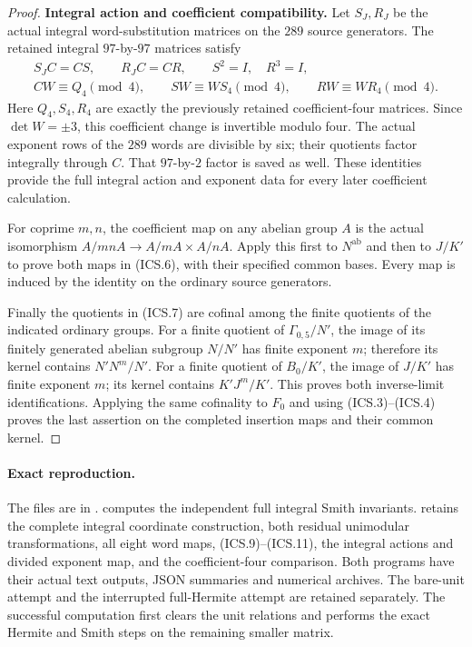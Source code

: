 \begin{proof}
\par\medskip\noindent\textbf{Integral action and coefficient compatibility.}\quad
Let $S_J,R_J$ be the actual integral word-substitution
matrices on the $289$ source generators. The retained
integral $97$-by-$97$ matrices satisfy
\[
 \begin{gathered}
 S_JC=CS,\qquad R_JC=CR,\qquad S^2=I,\quad R^3=I,\\
 CW\equiv Q_4\pmod4,\qquad
 SW\equiv WS_4\pmod4,\qquad RW\equiv WR_4\pmod4.
 \end{gathered}                                            \tag{ICS.14}
\]
Here $Q_4,S_4,R_4$ are exactly the previously retained
coefficient-four matrices. Since $\det W=\pm3$, this
coefficient change is invertible modulo four. The actual
exponent rows of the $289$ words are divisible by six;
their quotients factor integrally through $C$. That
$97$-by-$2$ factor is saved as well. These identities
provide the full integral action and exponent data for
every later coefficient calculation.

For coprime $m,n$, the coefficient map on any abelian group
$A$ is the actual isomorphism
$A/mnA\to A/mA\times A/nA$.
Apply this first to $N^{\mathrm{ab}}$ and then to
$J/K'$ to prove both maps in (ICS.6), with their specified
common bases. Every map is induced by the identity on the
ordinary source generators.

Finally the quotients in (ICS.7) are cofinal among the
finite quotients of the indicated ordinary groups.
For a finite quotient of $\Gamma_{0,5}/N'$, the image
of its finitely generated abelian subgroup $N/N'$ has
finite exponent $m$; therefore its kernel contains
$N'N^m/N'$. For a finite quotient of $B_0/K'$, the
image of $J/K'$ has finite exponent $m$; its kernel
contains $K'J^m/K'$. This proves both inverse-limit
identifications. Applying the same cofinality to $F_0$
and using (ICS.3)--(ICS.4) proves the last assertion on
the completed insertion maps and their common kernel.
\end{proof}

\paragraph{Exact reproduction.}
The files are in .
 computes the independent
full integral Smith invariants.
 retains the complete
integral coordinate construction, both residual unimodular
transformations, all eight word maps, (ICS.9)--(ICS.11),
the integral actions and divided exponent map, and the
coefficient-four comparison. Both programs have their
actual text outputs, JSON summaries and numerical archives.
The bare-unit attempt and the interrupted full-Hermite
attempt are retained separately. The successful computation
first clears the unit relations and performs the exact
Hermite and Smith steps on the remaining smaller matrix.
